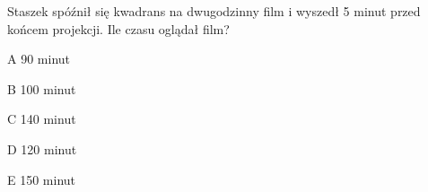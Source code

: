\begin{tresc}
Staszek spóźnił się kwadrans na dwugodzinny film i wyszedł 5 minut przed końcem projekcji. Ile czasu oglądał film?
\end{tresc}
\begin{wariant}{A} 90 minut \end{wariant}
\begin{wariant}{B} 100 minut \end{wariant}
\begin{wariant}{C} 140 minut \end{wariant}
\begin{wariant}{D} 120 minut \end{wariant}
\begin{wariant}{E} 150 minut \end{wariant}
